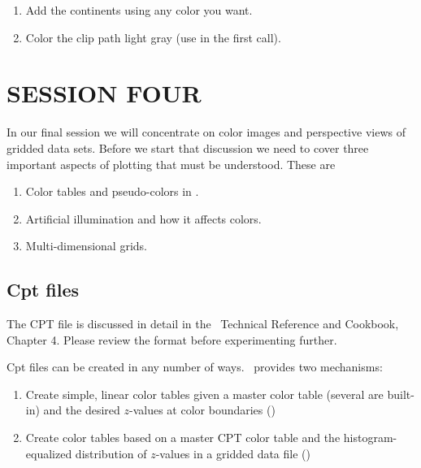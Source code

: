 \documentclass{report}
\begin{document}
\begin{enumerate}

\item Add the continents using any color you want.

\item Color the clip path light gray (use  in the first
 call).

\end{enumerate}

\chapter{SESSION FOUR}
\thispagestyle{headings}

In our final session we will concentrate on color images and
perspective views of gridded data sets.  Before we start that
discussion we need to cover three important aspects of plotting
that must be understood.  These are

\begin{enumerate}
\item Color tables and pseudo-colors in \GMT.
\item Artificial illumination and how it affects colors.
\item Multi-dimensional grids.
\end{enumerate}

\section{Cpt files}

The CPT file is discussed in detail in the \GMT\ Technical Reference
and Cookbook, Chapter 4.  Please review the format before experimenting
further.


Cpt files can be created in any number of ways.  \GMT\ provides
two mechanisms:\

\begin{enumerate}

\item Create simple, linear color tables given a master color table
(several are built-in) and the desired $z$-values at color boundaries
()

\item Create color tables based on a master CPT color table and the
histogram-equalized distribution of $z$-values in a gridded data file ()

\end{enumerate}
\end{document}

